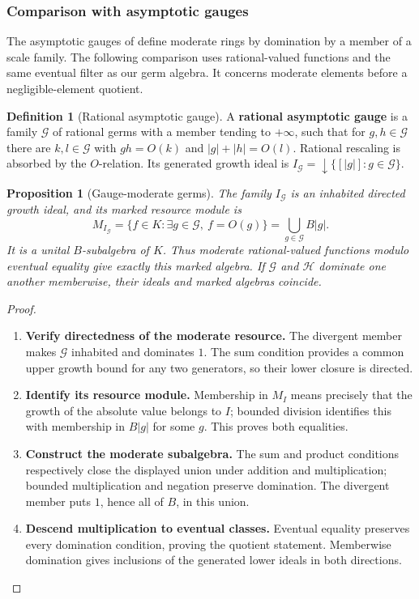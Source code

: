 \documentclass[11pt,a4paper]{article}
\numberwithin{algorithm}{section}
\numberwithin{equation}{section}
\newtheorem{proposition}[proposition]{Proposition}
\theoremstyle{definition}
\newtheorem{definition}[definition]{Definition}
\theoremstyle{remark}
\theoremstyle{plain}
\theoremstyle{definition}
\theoremstyle{plain}
\begin{document}
\subsubsection{Comparison with asymptotic gauges}
The asymptotic gauges of
\citep{GiordanoLuperiBaglini2016AsymptoticGauges} define moderate
rings by domination by a member of a scale family.
The following comparison uses rational-valued functions and the
same eventual filter as our germ algebra. It concerns moderate
elements before a negligible-element quotient.

\begin{definition}[Rational asymptotic gauge]
A \textbf{rational asymptotic gauge} is a family $\mathcal G$ of
rational germs with a member tending to $+\infty$, such that
for $g,h\in\mathcal G$ there are $k,l\in\mathcal G$ with
$gh=O(k)$ and $|g|+|h|=O(l)$.
Rational rescaling is absorbed by the $O$-relation.
Its generated growth ideal is
$I_{\mathcal G}=\downarrow\{[|g|]:g\in\mathcal G\}$.
\end{definition}

\begin{proposition}[Gauge-moderate germs]\label{prop:asymptotic-gauge-comparison}
The family $I_{\mathcal G}$ is an inhabited directed growth ideal,
and its marked resource module is
\[
 M_{I_{\mathcal G}}
   =\{f\in K:\exists g\in\mathcal G,\ f=O(g)\}
   =\bigcup_{g\in\mathcal G}B|g|.
\]
It is a unital $B$-subalgebra of $K$. Thus moderate rational-valued
functions modulo eventual equality give exactly this marked algebra.
If $\mathcal G$ and $\mathcal H$ dominate one another memberwise,
their ideals and marked algebras coincide.
\end{proposition}
\begin{proof}\leavevmode
\begin{enumerate}[leftmargin=*,align=left]
\item \textbf{Verify directedness of the moderate resource.}
The divergent member makes $\mathcal G$ inhabited and dominates
$1$. The sum condition provides a common upper growth bound
for any two generators, so their lower closure is directed.

\item \textbf{Identify its resource module.}
Membership in $M_I$ means precisely that the growth of the
absolute value belongs to $I$; bounded division identifies this
with membership in $B|g|$ for some $g$. This proves both equalities.

\item \textbf{Construct the moderate subalgebra.}
The sum and product conditions respectively close the displayed
union under addition and multiplication; bounded multiplication
and negation preserve domination. The divergent member puts
$1$, hence all of $B$, in this union.

\item \textbf{Descend multiplication to eventual classes.}
Eventual equality preserves every domination condition, proving
the quotient statement. Memberwise domination gives inclusions
of the generated lower ideals in both directions.
\end{enumerate}
\end{proof}
\end{document}
